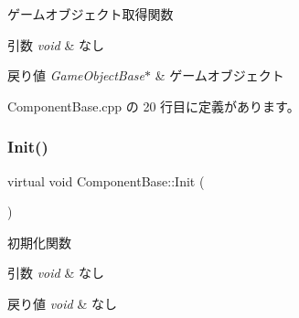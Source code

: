 ゲームオブジェクト取得関数 


\begin{DoxyParams}{引数}
{\em void} & なし \\
\hline
\end{DoxyParams}

\begin{DoxyRetVals}{戻り値}
{\em Game\+Object\+Base$\ast$} & ゲームオブジェクト \\
\hline
\end{DoxyRetVals}


 Component\+Base.\+cpp の 20 行目に定義があります。

\mbox{\label{class_component_base_a125939d6befe42f28886a6523e86b18b}} 
\subsubsection{\texorpdfstring{Init()}{Init()}}
{\footnotesize\ttfamily virtual void Component\+Base\+::\+Init (\begin{DoxyParamCaption}{ }\end{DoxyParamCaption})\hspace{0.3cm}{\ttfamily [pure virtual]}}



初期化関数 


\begin{DoxyParams}{引数}
{\em void} & なし \\
\hline
\end{DoxyParams}

\begin{DoxyRetVals}{戻り値}
{\em void} & なし \\
\hline
\end{DoxyRetVals}



